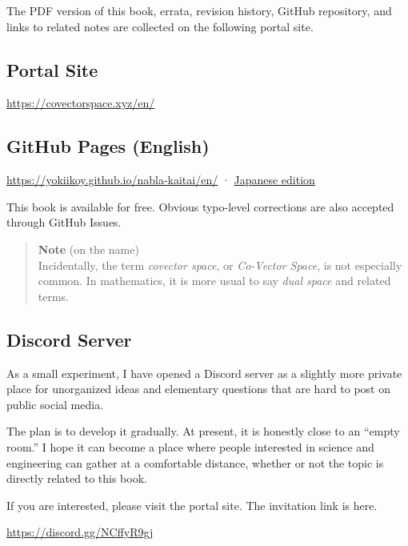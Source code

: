 The PDF version of this book, errata, revision history, GitHub
repository, and links to related notes are collected on the following
portal site.

\hypertarget{portal-site}{%
\subsection{Portal Site}\label{portal-site}}

\url{https://covectorspace.xyz/en/}

\hypertarget{github-pages-english}{%
\subsection{GitHub Pages (English)}\label{github-pages-english}}

\url{https://yokiikoy.github.io/nabla-kaitai/en/} ·
\href{https://yokiikoy.github.io/nabla-kaitai/}{Japanese edition}

This book is available for free. Obvious typo-level corrections are also
accepted through GitHub Issues.

\begin{quote}
\textbf{Note} (on the name)\\
Incidentally, the term \emph{covector space}, or \emph{Co-Vector Space},
is not especially common. In mathematics, it is more usual to say
\emph{dual space} and related terms.
\end{quote}

\hypertarget{discord-server}{%
\subsection{Discord Server}\label{discord-server}}

As a small experiment, I have opened a Discord server as a slightly more
private place for unorganized ideas and elementary questions that are
hard to post on public social media.

The plan is to develop it gradually. At present, it is honestly close to
an ``empty room.'' I hope it can become a place where people interested
in science and engineering can gather at a comfortable distance, whether
or not the topic is directly related to this book.

If you are interested, please visit the portal site. The invitation link
is here.

\url{https://discord.gg/NCffyR9gj}

\newpage

